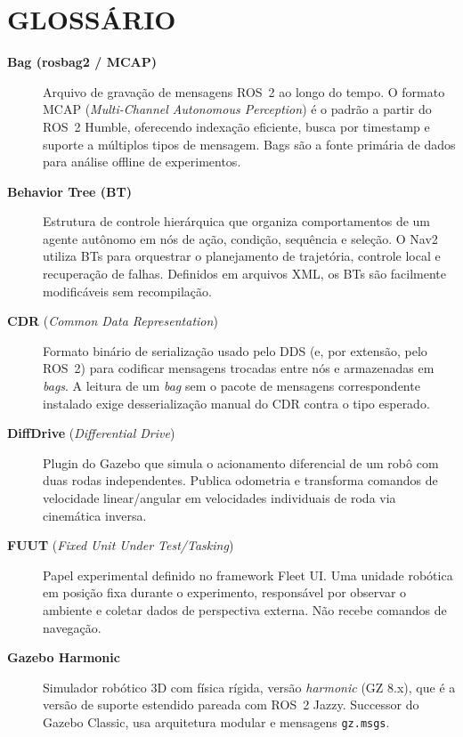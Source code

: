 \chapter*{GLOSSÁRIO}
\label{chap:glossario}

\begin{description}

\item[\textbf{Bag (rosbag2 / MCAP)}]
Arquivo de gravação de mensagens ROS~2 ao longo do tempo. O formato MCAP
(\textit{Multi-Channel Autonomous Perception}) é o padrão a partir do ROS~2 Humble,
oferecendo indexação eficiente, busca por timestamp e suporte a múltiplos tipos de
mensagem. Bags são a fonte primária de dados para análise offline de experimentos.

\item[\textbf{Behavior Tree (BT)}]
Estrutura de controle hierárquica que organiza comportamentos de um agente autônomo
em nós de ação, condição, sequência e seleção. O Nav2 utiliza BTs para orquestrar
o planejamento de trajetória, controle local e recuperação de falhas. Definidos em
arquivos XML, os BTs são facilmente modificáveis sem recompilação.

\item[\textbf{CDR} (\textit{Common Data Representation})]
Formato binário de serialização usado pelo DDS (e, por extensão, pelo ROS~2)
para codificar mensagens trocadas entre nós e armazenadas em \textit{bags}.
A leitura de um \textit{bag} sem o pacote de mensagens correspondente
instalado exige desserialização manual do CDR contra o tipo esperado.

\item[\textbf{DiffDrive} (\textit{Differential Drive})]
Plugin do Gazebo que simula o acionamento diferencial de um robô com duas rodas
independentes. Publica odometria e transforma comandos de velocidade linear/angular
em velocidades individuais de roda via cinemática inversa.

\item[\textbf{FUUT} (\textit{Fixed Unit Under Test/Tasking})]
Papel experimental definido no framework Fleet UI. Uma unidade robótica em posição
fixa durante o experimento, responsável por observar o ambiente e coletar dados
de perspectiva externa. Não recebe comandos de navegação.

\item[\textbf{Gazebo Harmonic}]
Simulador robótico 3D com física rígida, versão \textit{harmonic} (GZ 8.x),
que é a versão de suporte estendido pareada com ROS~2 Jazzy. Successor do
Gazebo Classic, usa arquitetura modular e mensagens \texttt{gz.msgs}.


\end{description}
